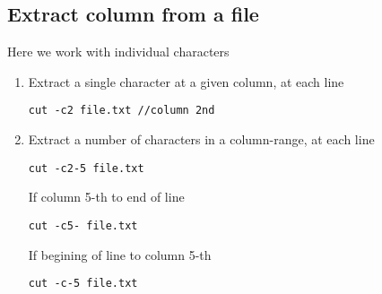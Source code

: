 \subsection{Extract column from a file}

Here we work with individual characters
\begin{enumerate}
  \item Extract a single character at a given column, at each line
\begin{verbatim}
cut -c2 file.txt //column 2nd
\end{verbatim}
   \item Extract a number of characters in a column-range, at each line
\begin{verbatim}
cut -c2-5 file.txt
\end{verbatim}   

If column 5-th to end of line
\begin{verbatim}
cut -c5- file.txt
\end{verbatim}

If begining of line to column 5-th
\begin{verbatim}
cut -c-5 file.txt
\end{verbatim} 
\end{enumerate}

